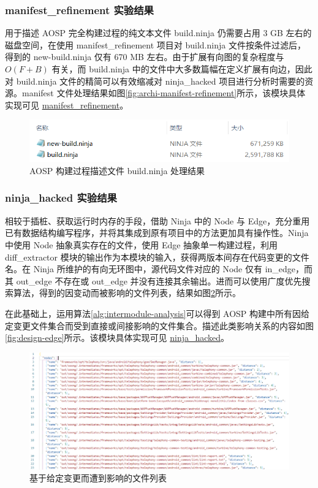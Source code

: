 \subsubsection{manifest\_refinement 实验结果}

用于描述 AOSP 完全构建过程的纯文本文件 build.ninja 仍需要占用 3 GB 左右的磁盘空间，在使用 manifest\_refinement 项目对 build.ninja 文件按条件过滤后，得到的 new-build.ninja 仅有 670 MB 左右。由于扩展有向图的复杂程度与 $O(F + B)$ 有关，而 build.ninja 中的文件中大多数篇幅在定义扩展有向边，因此对 build.ninja 文件的精简可以有效缩减对 ninja\_hacked 项目进行分析时需要的资源。manifest 文件处理结果如图\ref{fig:archi-manifest-refinement}所示，该模块具体实现可见 \href{https://github.com/AOSPworking/manifest_refinement}{manifest\_refinement}。

\begin{figure}
    \centering
    \includegraphics[width=.8\textwidth]{figures/design-manifest.png}
    \caption{AOSP 构建过程描述文件 build.ninja 处理结果}
    \label{fig:design-manifest}
\end{figure}

\subsubsection{ninja\_hacked 实验结果}

相较于插桩、获取运行时内存的手段，借助 Ninja 中的 Node 与 Edge，充分重用已有数据结构编写程序，并将其集成到原有项目中的方法更加具有操作性。Ninja 中使用 Node 抽象真实存在的文件，使用 Edge 抽象单一构建过程，利用 diff\_extractor 模块的输出作为本模块的输入，获得两版本间存在代码变更的文件名。在 Ninja 所维护的有向无环图中，源代码文件对应的 Node 仅有 in\_edge，而其 out\_edge 不存在或 out\_edge 并没有连接其余输出。进而可以使用广度优先搜索算法，得到的因变动而被影响的文件列表，结果如图\ref{fig:design-node}所示。

在此基础上，运用算法\ref{alg:intermodule-analysis}可以得到 AOSP 构建中所有因给定变更文件集合而受到直接或间接影响的文件集合。描述此类影响关系的内容如图\ref{fig:design-edge}所示。该模块具体实现可见 \href{https://github.com/AOSPworking/ninja-hacked}{ninja\_hacked}。

\begin{figure}
    \centering
    \includegraphics[width=.8\textwidth]{figures/design-node.png}
    \caption{基于给定变更而遭到影响的文件列表}
    \label{fig:design-node}
\end{figure}

